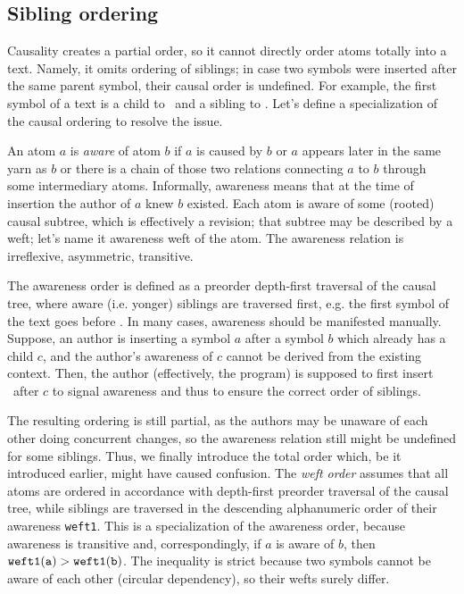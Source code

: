 \documentclass{acm_proc_article-sp}
\begin{document}
\subsection {Sibling ordering}  \label{sec:siblord}

Causality creates a partial order, so it cannot directly order atoms totally into a text.
Namely, it omits ordering of siblings; in case two symbols were inserted after the same parent symbol, their causal order is undefined.
For example, the first symbol of a text is a child to \aum ~and a sibling to \eoa.
Let's define a specialization of the causal ordering to resolve the issue.

An atom $a$ is \emph{aware} of atom $b$ if $a$ is caused by $b$ or $a$ appears later in the same yarn as $b$ or there is a chain of those two relations connecting $a$ to $b$ through some intermediary atoms.
Informally, awareness means that at the time of insertion the author of $a$ knew $b$ existed. 
Each atom is aware of some (rooted) causal subtree, which is effectively a revision; that subtree may be described by a weft; let's name it awareness weft of the atom.
The awareness relation is irreflexive, asymmetric, transitive.

The awareness order is  defined as a preorder depth-first traversal of the causal tree, where aware (i.e. yonger) siblings are traversed first, e.g. the first symbol of the text goes before \eoa.
In many cases, awareness should be manifested manually.
Suppose, an author is inserting a symbol $a$ after a symbol $b$ which already has a child $c$, and the author's awareness of $c$ cannot be derived from the existing context.
Then, the author (effectively, the program) is supposed to first insert \zero ~after $c$ to signal awareness and thus to ensure the correct order of siblings.

The resulting ordering is still partial, as the authors may be unaware of each other doing concurrent changes, so the awareness relation still might be undefined for some siblings.
Thus, we finally introduce the total order which, be it introduced earlier, might have caused confusion.
The \emph{weft order} assumes that all atoms are ordered in accordance with depth-first preorder traversal of the causal tree, while siblings are traversed in the descending  alphanumeric order of their awareness {\tt weft1}.
This is a specialization of the awareness order, because awareness is transitive and, correspondingly, if $a$ is aware of $b$, then $\tt weft1(a) > weft1(b)$.
The inequality is strict because two symbols cannot be aware of each other (circular dependency), so their wefts surely differ.
\end{document}
